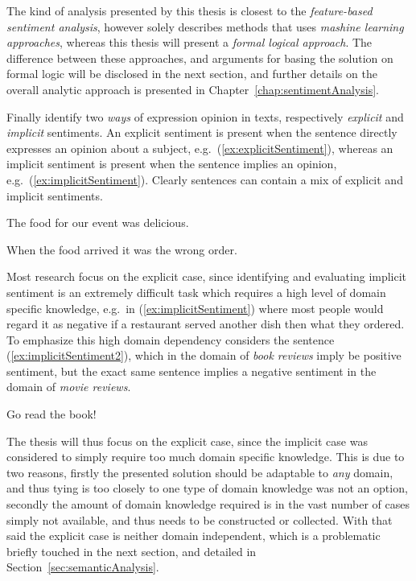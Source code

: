 
The kind of analysis presented by this thesis is closest to the \emph{feature-based sentiment analysis}, however \citeauthor{webDataMining}  solely describes methods that uses \emph{mashine learning approaches}, whereas this thesis will present a \emph{formal logical approach}. The difference between these approaches, and arguments for basing the solution on formal logic will be disclosed in the next section, and further details on the overall analytic approach is presented in Chapter~\ref{chap:sentimentAnalysis}.

Finally \citeauthor{webDataMining}  identify two \emph{ways} of expression opinion in texts, respectively \emph{explicit} and \emph{implicit} sentiments. An explicit sentiment is present when the sentence directly expresses an opinion about a subject, e.g.\ (\ref{ex:explicitSentiment}), whereas an implicit sentiment is present when the sentence implies an opinion, e.g.\ (\ref{ex:implicitSentiment}). Clearly sentences can contain a mix of explicit and implicit sentiments.
\begin{numquote}
	 The food for our event was delicious.
	\label{ex:explicitSentiment}
\end{numquote}
\begin{numquote}
	 When the food arrived it was the wrong order.
	\label{ex:implicitSentiment}
\end{numquote}

Most research focus on the explicit case, since identifying and evaluating implicit sentiment is an extremely difficult task which requires a high level of domain specific knowledge, e.g.\ in (\ref{ex:implicitSentiment}) where most people would regard it as negative if a restaurant served another dish then what they ordered. To emphasize this high domain dependency \citeauthor{omsa}  considers the sentence (\ref{ex:implicitSentiment2}), which in the domain of \emph{book reviews} imply be positive sentiment, but the exact same sentence implies a negative sentiment in the domain of \emph{movie reviews}.
\begin{numquote}
	 Go read the book!
	\label{ex:implicitSentiment2}
\end{numquote}

The thesis will thus focus on the explicit case, since the implicit case was considered to simply require too much domain specific knowledge. This is due to two reasons, firstly the presented solution should be adaptable to \emph{any} domain, and thus tying is too closely to one type of domain knowledge was not an option, secondly the amount of domain knowledge required is in the vast number of cases simply not available, and thus needs to be constructed or collected. With that said the explicit case is neither domain independent, which is a problematic briefly touched in the next section, and detailed in Section~\ref{sec:semanticAnalysis}.

